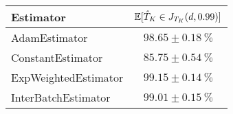 \begin{tabular}{lc}
\toprule
           Estimator & $\operatorname{\mathbb{E}}[\hat{T}_K \in J_{T_K}(d, {0.99})]$ \\
\midrule
       AdamEstimator &                    $98.65 \pm 0.18~\%$ \\
   ConstantEstimator &                    $85.75 \pm 0.54~\%$ \\
ExpWeightedEstimator &                    $99.15 \pm 0.14~\%$ \\
 InterBatchEstimator &                    $99.01 \pm 0.15~\%$ \\
\bottomrule
\end{tabular}
